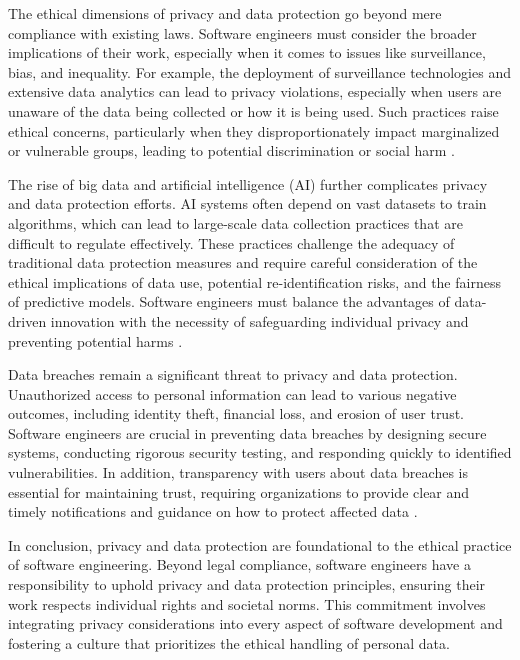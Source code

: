 \begin{refsection}
The ethical dimensions of privacy and data protection go beyond mere compliance with existing laws. Software engineers must consider the broader implications of their work, especially when it comes to issues like surveillance, bias, and inequality. For example, the deployment of surveillance technologies and extensive data analytics can lead to privacy violations, especially when users are unaware of the data being collected or how it is being used. Such practices raise ethical concerns, particularly when they disproportionately impact marginalized or vulnerable groups, leading to potential discrimination or social harm \cite[pp.~51-54]{zuboff2020age}.

The rise of big data and artificial intelligence (AI) further complicates privacy and data protection efforts. AI systems often depend on vast datasets to train algorithms, which can lead to large-scale data collection practices that are difficult to regulate effectively. These practices challenge the adequacy of traditional data protection measures and require careful consideration of the ethical implications of data use, potential re-identification risks, and the fairness of predictive models. Software engineers must balance the advantages of data-driven innovation with the necessity of safeguarding individual privacy and preventing potential harms \cite[pp.~82-85]{oneil2020weapons}.

Data breaches remain a significant threat to privacy and data protection. Unauthorized access to personal information can lead to various negative outcomes, including identity theft, financial loss, and erosion of user trust. Software engineers are crucial in preventing data breaches by designing secure systems, conducting rigorous security testing, and responding quickly to identified vulnerabilities. In addition, transparency with users about data breaches is essential for maintaining trust, requiring organizations to provide clear and timely notifications and guidance on how to protect affected data \cite[pp.~141-144]{schneier2015data}.

In conclusion, privacy and data protection are foundational to the ethical practice of software engineering. Beyond legal compliance, software engineers have a responsibility to uphold privacy and data protection principles, ensuring their work respects individual rights and societal norms. This commitment involves integrating privacy considerations into every aspect of software development and fostering a culture that prioritizes the ethical handling of personal data.


\end{refsection}

